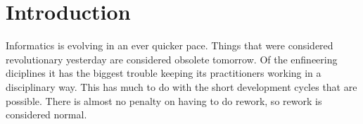 \section{Introduction}

Informatics is evolving in an ever quicker pace. Things that were
considered revolutionary yesterday are considered obsolete tomorrow.
Of the enfineering diciplines it has the biggest trouble keeping its
practitioners working in a disciplinary way. This has much to do with
the short development cycles that are possible. There is almost no
penalty on having to do rework, so rework is considered normal.



